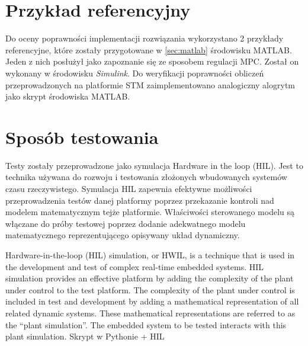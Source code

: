 \section{Przykład referencyjny} \label{sec:ref}
Do oceny poprawności implementacji rozwiązania wykorzystano 2 przykłady referencyjne, które zostały
przygotowane w \ref{sec:matlab} środowisku MATLAB. Jeden z nich posłużył jako zapoznanie się ze
sposobem regulacji MPC. Został on wykonany w środowisku \textit{Simulink}. 
Do weryfikacji poprawności obliczeń przeprowadzonych na platformie STM zaimplementowano analogiczny
alogrytm jako skrypt środowiska MATLAB.  

\section{Sposób testowania} \label{sec:tests}
Testy zostały przeprowadzone jako symulacja Hardware in the loop (HIL). Jest to technika używana
do rozwoju i testowania złożonych wbudowanych systemów czasu rzeczywistego. Symulacja HIL zapewnia
efektywne możliwości przeprowadzenia testów danej platformy poprzez przekazanie kontroli nad 
modelem matematycznym tejże platformie. Właściwości sterowanego modelu są włączane do próby testowej
poprzez dodanie adekwatnego modelu matematycznego reprezentującego opisywany układ dynamiczny. 

Hardware-in-the-loop (HIL) simulation, or HWIL, is a technique that is used in the development
and test of complex real-time embedded systems. HIL simulation provides an effective platform 
by adding the complexity of the plant under control to the test platform. The complexity
of the plant under control is included in test and development by adding a mathematical
representation of all related dynamic systems. These mathematical representations are referred
to as the “plant simulation”. The embedded system to be tested interacts with this plant simulation.
Skrypt w Pythonie + HIL

